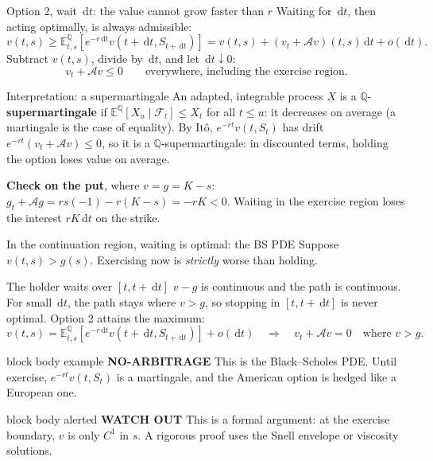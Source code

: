 \documentclass[handout,10pt,aspectratio=169]{beamer}
\newenvironment{marketbox}{\begin{beamercolorbox}[rounded=true,sep=0.7em,wd=\textwidth]{block body example}
  \textbf{\color{CourseGreen}NO-ARBITRAGE}\quad}{\end{beamercolorbox}}
\newenvironment{simplificationbox}{\begin{beamercolorbox}[rounded=true,sep=0.7em,wd=\textwidth]{block body alerted}
  \textbf{\color{CourseRed}WATCH OUT}\quad}{\end{beamercolorbox}}
\newcommand{\E}{\mathbb E}
\newcommand{\Q}{\mathbb Q}
\newcommand{\cF}{\mathcal F}
\newcommand{\dd}{\,\mathrm d}
\begin{document}
\begin{frame}{Option 2, wait \(\dd t\): the value cannot grow faster than \(r\)}
\small
Waiting for \(\dd t\), then acting optimally, is always admissible:
\[
v(t,s)\geq\E^\Q_{t,s}\!\left[e^{-r\dd t}v(t+\dd t,S_{t+\dd t})\right]
=v(t,s)+(v_t+\mathcal Av)(t,s)\dd t+o(\dd t).
\]
Subtract \(v(t,s)\), divide by \(\dd t\), and let \(\dd t\downarrow0\):
\[
\boxed{v_t+\mathcal Av\leq0\qquad\text{everywhere, including the exercise region.}}
\]
\begin{block}{Interpretation: a supermartingale}
An adapted, integrable process \(X\) is a \(\Q\)-\textbf{supermartingale} if
\(\E^\Q[X_u\mid\cF_t]\leq X_t\) for all \(t\leq u\): it decreases on average
(a martingale is the case of equality). By It\^o, \(e^{-rt}v(t,S_t)\) has
drift \(e^{-rt}(v_t+\mathcal Av)\leq0\), so it is a \(\Q\)-supermartingale:
in discounted terms, holding the option loses value on average.
\end{block}
\textbf{Check on the put}, where \(v=g=K-s\):
\(g_t+\mathcal Ag=rs(-1)-r(K-s)=-rK<0\). Waiting in the exercise region
loses the interest \(rK\dd t\) on the strike.
\end{frame}

\begin{frame}{In the continuation region, waiting is optimal: the BS PDE}
Suppose \(v(t,s)>g(s)\). Exercising now is \emph{strictly} worse than holding.
\begin{block}{The holder waits over \([t,t+\dd t]\)}
\(v-g\) is continuous and the path is continuous. For small \(\dd t\), the
path stays where \(v>g\), so stopping in \([t,t+\dd t]\) is never optimal.
Option 2 attains the maximum:
\[
v(t,s)=\E^\Q_{t,s}\!\left[e^{-r\dd t}v(t+\dd t,S_{t+\dd t})\right]+o(\dd t)
\quad\Longrightarrow\quad
\boxed{v_t+\mathcal Av=0\quad\text{where }v>g.}
\]
\end{block}
\begin{marketbox}
This is the Black--Scholes PDE. Until exercise, \(e^{-rt}v(t,S_t)\) is a
martingale, and the American option is hedged like a European one.
\end{marketbox}
\begin{simplificationbox}
This is a formal argument: at the exercise boundary, \(v\) is only \(C^1\) in
\(s\). A rigorous proof uses the Snell envelope or viscosity solutions.
\end{simplificationbox}
\end{frame}
\end{document}
